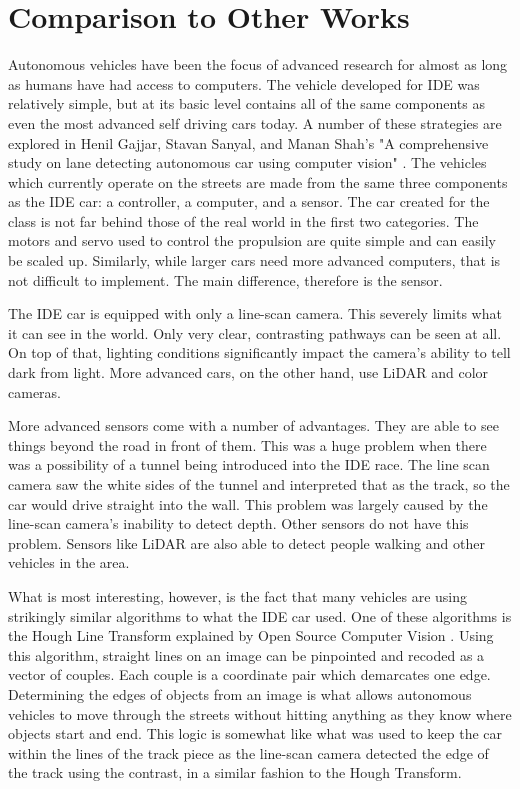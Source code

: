 \documentclass[conference]{IEEEtran}
\begin{document}
\section{Comparison to Other Works}
    Autonomous vehicles have been the focus of advanced research for almost as
    long as humans have had access to computers. The vehicle developed for IDE
    was relatively simple, but at its basic level contains all of the same
    components as even the most advanced self driving cars today. A number of
    these strategies are explored in Henil Gajjar, Stavan Sanyal, and Manan
    Shah's "A comprehensive study on lane detecting autonomous car using
    computer vision" \cite{b2}.    
    The vehicles which currently operate on the streets are made from the same
    three components as the IDE car: a controller, a computer, and a sensor.
    The car created for the class is not far behind those of the real world
    in the first two categories. The motors and servo used to control the
    propulsion are quite simple and can easily be scaled up. Similarly, while
    larger cars need more advanced computers, that is not difficult to
    implement. The main difference, therefore is the sensor.

    The IDE car is equipped with only a line-scan camera. This severely limits
    what it can see in the world. Only very clear, contrasting pathways can
    be seen at all. On top of that, lighting conditions significantly impact
    the camera's ability to tell dark from light. More advanced cars, on the
    other hand, use LiDAR and color cameras.

    More advanced sensors come with a number of advantages. They are able to
    see things beyond the road in front of them. This was a huge problem when
    there was a possibility of a tunnel being introduced into the IDE race.
    The line scan camera saw the white sides of the tunnel and interpreted 
    that as the track, so the car would drive straight into the wall. This
    problem was largely caused by the line-scan camera's inability to detect
    depth. Other sensors do not have this problem. Sensors like LiDAR are also
    able to detect people walking and other vehicles in the area.

    What is most interesting, however, is the fact that many vehicles are
    using strikingly similar algorithms to what the IDE car used. One of these
    algorithms is the Hough Line Transform explained by Open Source Computer
    Vision \cite{b3}. Using this algorithm, straight lines on an image can be pinpointed
    and recoded as a vector of couples. Each couple is a coordinate pair which
    demarcates one edge. Determining the edges of objects from an image is
    what allows autonomous vehicles to move through the streets without
    hitting anything as they know where objects start and end. This logic is
    somewhat like what was used to keep the car within the lines of the track
    piece as the line-scan camera detected the edge of the track using the
    contrast, in a similar fashion to the Hough Transform.
\end{document}
